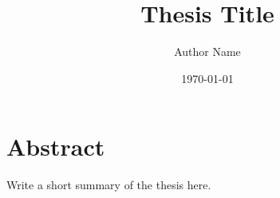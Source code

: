 \documentclass[11pt]{report}
\title{Thesis Title}
\author{Author Name}
\date{\today}
\begin{document}
\maketitle

\tableofcontents

\chapter*{Abstract}
Write a short summary of the thesis here.








\end{document}
